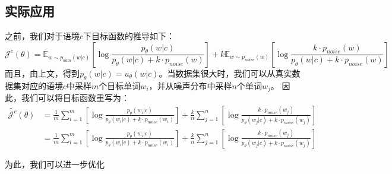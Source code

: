 \documentclass{article}
\begin{document}
\subsection{实际应用}

之前，我们对于语境$c$下目标函数的推导如下：
\begin{equation}
    \mathcal{J}^c(\theta) = \mathbb{E}_{w \sim p_{data}(w|c)} \left[ \log \frac{p_\theta(w|c)}{p_\theta(w|c)+k \cdot p_{noise}(w)} \right]  + k  \mathbb{E}_{w \sim p_{noise}(w)} \left[ \log \frac{k \cdot p_{noise}(w)}{p_\theta(w|c)+k \cdot p_{noise}(w)}  \right] 
\end{equation}
而且，由上文，得到$p_\theta(w|c) = u_\theta(w|c)$。当数据集很大时，我们可以从真实数据集对应的语境$c$中采样$m$个目标单词$w_i$，并从噪声分布中采样$n$个单词$w_j$。
因此，我们可以将目标函数重写为：
\begin{equation}
    \begin{split}
        \tilde{\mathcal{J}^c}(\theta) &= \frac{1}{m} \sum_{i=1}^m \left[ \log \frac{p_\theta(w_i|c)}{p_\theta(w_i|c)+k \cdot p_{noise}(w_i)} \right]  + \frac{k}{n}   \sum_{j=1}^n \left[ \log \frac{k \cdot p_{noise}(w_j)}{p_\theta(w_j|c)+k \cdot p_{noise}(w_j)}  \right] \\
        &= \frac{1}{m} \sum_{i=1}^m \left[ \log \frac{p_\theta(w_i|c)}{p_\theta(w_i|c)+k \cdot p_{noise}(w_i)} \right]  + \frac{k}{n}   \sum_{j=1}^n \left[ \log \frac{k \cdot p_{noise}(w_j)}{p_\theta(w_j|c)+k \cdot p_{noise}(w_j)}  \right]
    \end{split}
\end{equation}

为此，我们可以进一步优化
\end{document}
